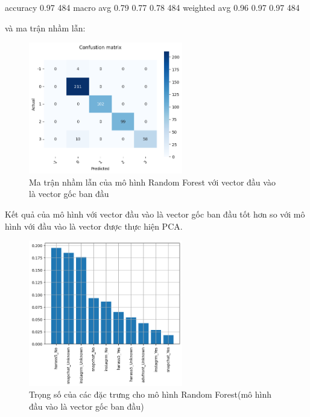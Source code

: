 \begin{enumerate}[label=(\alph*)]
\begin{python}
    accuracy                           0.97       484
   macro avg       0.79      0.77      0.78       484
weighted avg       0.96      0.97      0.97       484
    \end{python}

    và ma trận nhầm lẫn:

    \begin{figure}[H]
        \centering
        \includegraphics[width=0.6\textwidth]{figures/Thanh/Data_Analysis/With_null_confusion_matrix_Random_Forest_original_features.png}
        \caption{Ma trận nhầm lẫn của mô hình Random Forest với vector đầu vào là vector gốc ban đầu}
        \label{fig:With_null_confusion_matrix_Random_Forest_original_features}
    \end{figure}

    Kết quả của mô hình với vector đầu vào là vector gốc ban đầu tốt hơn so với mô hình với đầu vào là vector được thực hiện PCA.

    \begin{figure}[H]
        \centering
        \includegraphics[width=0.6\textwidth]{figures/Thanh/Data_Analysis/With_null_Feature_Importance_Random_Forest_original_features.png}
        \caption{Trọng số của các đặc trưng cho mô hình Random Forest(mô hình đầu vào là vector gốc ban đầu)}
        \label{fig:With_null_Feature_Importance_Random_Forest_original_features}
    \end{figure}


\end{enumerate}
